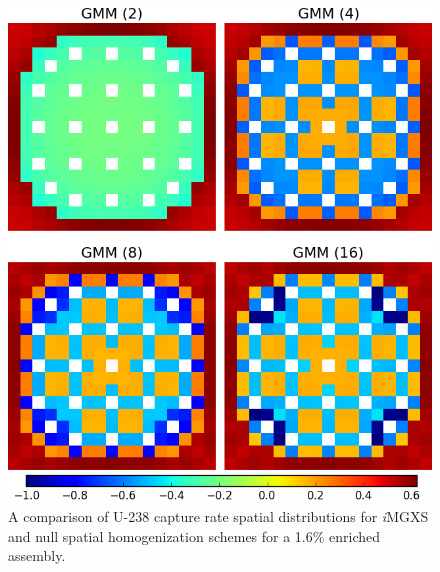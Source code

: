 \begin{figure}[h!]
\centering
\includegraphics[width=0.9\linewidth]{figures/results/compare/assm-16/compare-capt}
\vspace{2mm}
\caption[U-238 capture rate comparison for a 1.6\% enriched assembly]{A comparison of U-238 capture rate spatial distributions for \textit{i}\ac{MGXS} and null spatial homogenization schemes for a 1.6\% enriched assembly.}
\label{fig:chap11-assm-1.6-capt-rates-comp}
\end{figure}

\clearpage

